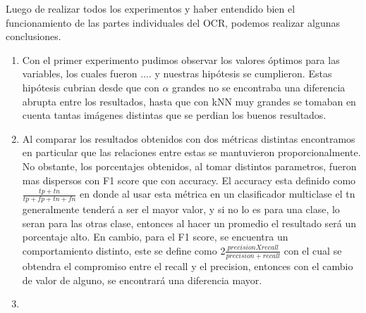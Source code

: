Luego de realizar todos los experimentos y haber entendido bien el funcionamiento de las partes individuales del OCR, podemos realizar algunas conclusiones.

\begin{enumerate}
	\item Con el primer experimento pudimos observar los valores óptimos para las variables, los cuales fueron .... y nuestras hipótesis se cumplieron. Estas hipótesis cubrian desde que con $\alpha$ grandes no se encontraba una diferencia abrupta entre los resultados, hasta que con kNN muy grandes se tomaban en cuenta tantas imágenes distintas que se perdian los buenos resultados.
	\item Al comparar los resultados obtenidos con dos métricas distintas encontramos en particular que las relaciones entre estas se mantuvieron proporcionalmente. No obstante, los porcentajes obtenidos, al tomar distintos parametros, fueron mas dispersos con F1 score que con accuracy. El accuracy esta definido como $\frac{tp + tn}{tp + fp + tn + fn}$ en donde al usar esta métrica en un clasificador multiclase el tn generalmente tenderá a ser el mayor valor, y si no lo es para una clase, lo seran para las otras clase, entonces al hacer un promedio el resultado será un porcentaje alto. En cambio, para el F1 score, se encuentra un comportamiento distinto, este se define como 2$\frac{precisionXrecall}{precision + recall}$ con el cual se obtendra el compromiso entre el recall y el precision, entonces con el cambio de valor de alguno, se encontrará una diferencia mayor.
	\item 

\end{enumerate}